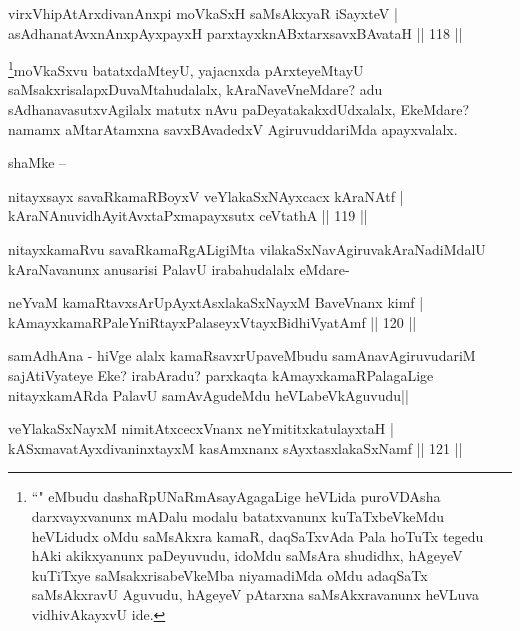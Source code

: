\begin{shl}
virxVhipAtArxdivanAnxpi moVkaSxH saMsAkxyaR iSayxteV |\\
asAdhanatAvxnAnxpAyxpayxH parxtayxknABxtarxsavxBAvataH \hfill || 118 ||
\end{shl}

\begin{artha}
\footnote{``\stext" eMbudu dashaRpUNaRmAsayAgagaLige heVLida puroVDAsha darxvayxvanunx mADalu modalu batatxvanunx kuTaTxbeVkeMdu heVLidudx oMdu saMsAkxra kamaR, daqSaTxvAda Pala hoTuTx tegedu hAki akikxyanunx paDeyuvudu, idoMdu saMsAra shudidhx, hAgeyeV kuTiTxye saMsakxrisabeVkeMba niyamadiMda oMdu adaqSaTx saMsAkxravU Aguvudu, hAgeyeV pAtarxna saMsAkxravanunx heVLuva vidhivAkayxvU ide.}moVkaSxvu batatxdaMteyU, yajacnxda pArxteyeMtayU saMsakxrisalapxDuvaMtahudalalx, kAraNaveVneMdare? adu sAdhanavasutxvAgilalx matutx nAvu paDeyatakakxdUdxalalx, EkeMdare? namamx aMtarAtamxna savxBAvadedxV AgiruvuddariMda apayxvalalx.
\end{artha}

\begin{artha}
shaMke --
\end{artha}

\begin{shl}
nitayxsayx savaRkamaRBoyxV veYlakaSxNAyxcacx kAraNAtf |\\
kAraNAnuvidhAyitAvxtaPxmapayxsutx ceVtathA \hfill || 119 ||
\end{shl}

\begin{artha}
nitayxkamaRvu savaRkamaRgALigiMta vilakaSxNavAgiruvakAraNadiMdalU kAraNavanunx anusarisi PalavU irabahudalalx eMdare-
\end{artha}


\begin{shl}
neYvaM kamaRtavxsArUpAyxtAsxlakaSxNayxM BaveVnanx kimf |\\
kAmayxkamaRPaleYniRtayxPalaseyxVtayxBidhiVyatAmf \hfill || 120 ||
\end{shl}

\begin{artha}
samAdhAna - hiVge alalx kamaRsavxrUpaveMbudu samAnavAgiruvudariM sajAtiVyateye Eke? irabAradu? parxkaqta kAmayxkamaRPalagaLige nitayxkamARda PalavU samAvAgudeMdu heVLabeVkAguvudu||
\end{artha}

\begin{shl}
veYlakaSxNayxM nimitAtxcecxVnanx neYmititxkatulayxtaH |\\
kASxmavatAyxdivaninxtayxM kasAmxnanx sAyxtasxlakaSxNamf \hfill || 121 ||
\end{shl}

